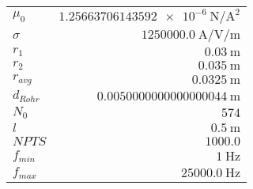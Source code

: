 
{%
    \begin{center}
    \label{tab:fitparams:st:freq:approx}
    \begin{tabular}{lr}
    \toprule
        $\mu_0$ & $\SI{1.25663706143592e-6}{\newton\per\ampere\squared}$\\
        $\sigma$ & $\SI{1250000.0}{\ampere\per\volt\per\meter}$\\
        $r_1$ & $\SI{0.03}{\meter}$\\
        $r_2$ & $\SI{0.035}{\meter}$\\
        $r_{avg}$ & $\SI{0.0325}{\meter}$\\
        $d_{Rohr}$ & $\SI{0.0050000000000000044}{\meter}$\\
        $N_0$ & $\num{574}$\\
        $l$ & $\SI{0.5}{\meter}$\\
        $NPTS$ & $\num{1000.0}$\\
        $f_{min}$ & $\SI{1}{\hertz}$\\
        $f_{max}$ & $\SI{25000.0}{\hertz}$\\

    \bottomrule
    \end{tabular}
    \end{center}
}

